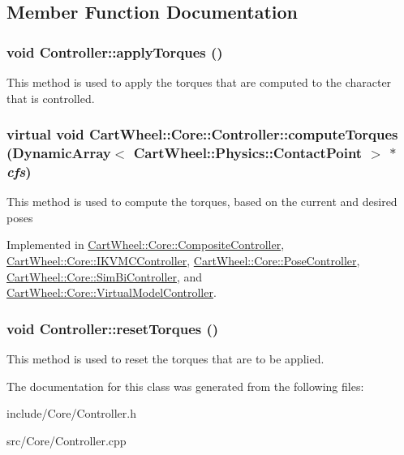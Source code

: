 \subsection{Member Function Documentation}
\hypertarget{classCartWheel_1_1Core_1_1Controller_a6502c5453efc4025d553365fe09b404b}{
\subsubsection[{applyTorques}]{\setlength{\rightskip}{0pt plus 5cm}void Controller::applyTorques ()}}
\label{classCartWheel_1_1Core_1_1Controller_a6502c5453efc4025d553365fe09b404b}
This method is used to apply the torques that are computed to the character that is controlled. \hypertarget{classCartWheel_1_1Core_1_1Controller_a4355027883ca8a1be4048d95577b8e74}{
\subsubsection[{computeTorques}]{\setlength{\rightskip}{0pt plus 5cm}virtual void CartWheel::Core::Controller::computeTorques (DynamicArray$<$ {\bf CartWheel::Physics::ContactPoint} $>$ $\ast$ {\em cfs})}}
\label{classCartWheel_1_1Core_1_1Controller_a4355027883ca8a1be4048d95577b8e74}
This method is used to compute the torques, based on the current and desired poses 

Implemented in \hyperlink{classCartWheel_1_1Core_1_1CompositeController_a03b84a4f22ace37730af71e63ab765cd}{CartWheel::Core::CompositeController}, \hyperlink{classCartWheel_1_1Core_1_1IKVMCController_a0a944ad3c3178ecc74488c1697460883}{CartWheel::Core::IKVMCController}, \hyperlink{classCartWheel_1_1Core_1_1PoseController_a48cf8c4a4ef762251f03a01ed8c24cd0}{CartWheel::Core::PoseController}, \hyperlink{classCartWheel_1_1Core_1_1SimBiController_aa6510698f1e27b154ace8e9459080322}{CartWheel::Core::SimBiController}, and \hyperlink{classCartWheel_1_1Core_1_1VirtualModelController_ae4cf418528c2c3df886a552cb4eb14b2}{CartWheel::Core::VirtualModelController}.

\hypertarget{classCartWheel_1_1Core_1_1Controller_a0847b1ef66cec7b82983b6990bb8265f}{
\subsubsection[{resetTorques}]{\setlength{\rightskip}{0pt plus 5cm}void Controller::resetTorques ()}}
\label{classCartWheel_1_1Core_1_1Controller_a0847b1ef66cec7b82983b6990bb8265f}
This method is used to reset the torques that are to be applied. 

The documentation for this class was generated from the following files:\begin{DoxyCompactItemize}
\item 
include/Core/Controller.h\item 
src/Core/Controller.cpp\end{DoxyCompactItemize}
